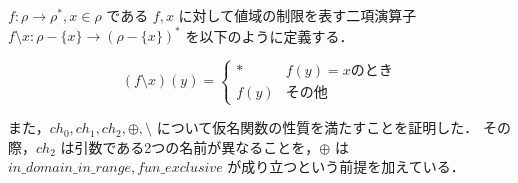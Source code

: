 \begin{dfn}
  $f : \rho \rightarrow \rho^*, x \in \rho$ である $f, x$ に対して値域の制限を表す二項演算子 $f \setminus x : \rho - \{x\} \rightarrow (\rho - \{x\})^*$ を以下のように定義する． \\
\begin{adjustvboxheight}
  \[ (f \setminus x)(y) = \begin{cases}
    \ast & f(y) = x \mbox{のとき} \\
    f(y) & \mbox{その他}
  \end{cases} \]
  \vspace{1pt}
\end{adjustvboxheight}
\end{dfn}


また，$ch_0, ch_1, ch_2, \oplus, \setminus$ について仮名関数の性質を満たすことを証明した．
その際，$ch_2$ は引数である2つの名前が異なることを，$\oplus$ は $in\_domain\_in\_range, fun\_exclusive$ が成り立つという前提を加えている．










